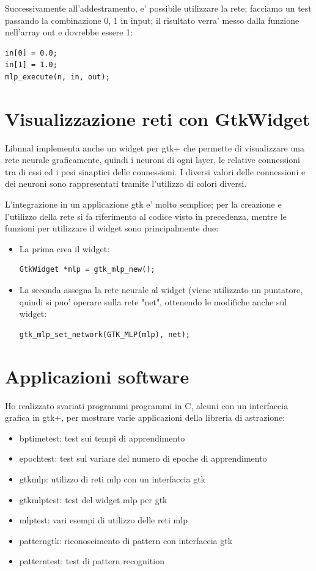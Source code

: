 \documentclass[a4paper,10pt]{report}
\begin{document}
Successivamente all'addestramento, e' possibile utilizzare la rete; facciamo un test
passando la combinazione 0, 1 in input; il risultato verra' messo dalla funzione
nell'array out e dovrebbe essere 1:

\begin{verbatim}
in[0] = 0.0;
in[1] = 1.0;
mlp_execute(n, in, out);
\end{verbatim}

\newpage
\section{Visualizzazione reti con GtkWidget}
Libnnal implementa anche un widget per gtk+ che permette di visualizzare
una rete neurale graficamente, quindi i neuroni di ogni layer, le relative connessioni
tra di essi ed i pesi sinaptici delle connessioni. I diversi valori delle connessioni
e dei neuroni sono rappresentati tramite l'utilizzo di colori diversi.

L'integrazione
in un applicazione gtk e' molto semplice; per la creazione e l'utilizzo
della rete si fa riferimento al codice visto in precedenza, mentre le funzioni
per utilizzare il widget sono principalmente due:
\begin{itemize}
\item La prima crea il widget:
\begin{verbatim}
GtkWidget *mlp = gtk_mlp_new();
\end{verbatim}

\item La seconda assegna la rete neurale al widget (viene utilizzato un puntatore,
quindi si puo' operare sulla rete "net", ottenendo le modifiche anche sul widget:
\begin{verbatim}
gtk_mlp_set_network(GTK_MLP(mlp), net);
\end{verbatim}
\end{itemize}


\section{Applicazioni software}
Ho realizzato svariati programmi programmi in C, alcuni con un interfaccia
grafica in gtk+, per mostrare varie applicazioni della libreria di astrazione:
\begin{itemize}
\item bptimetest: test sui tempi di apprendimento
\item epochtest: test sul variare del numero di epoche di apprendimento
\item gtkmlp: utilizzo di reti mlp con un interfaccia gtk
\item gtkmlptest: test del widget mlp per gtk
\item mlptest: vari esempi di utilizzo delle reti mlp
\item patterngtk: riconoscimento di pattern con interfaccia gtk
\item patterntest: test di pattern recognition
\end{itemize}
\end{document}
